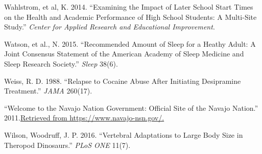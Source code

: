 \documentclass[
]{report}
\newlength{\cslhangindent}
\newenvironment{CSLReferences}[2] %
 {\begin{list}{}{%
  \setlength{\itemindent}{0pt}
  \setlength{\leftmargin}{0pt}
  \setlength{\parsep}{0pt}
  \ifodd #1
   \setlength{\leftmargin}{\cslhangindent}
   \setlength{\itemindent}{-1\cslhangindent}
  \fi
  \setlength{\itemsep}{#2\baselineskip}}}
 {\end{list}}
\begin{document}
\begin{CSLReferences}{1}{0}
Wahlstrom, et al, K. 2014. {``Examining the Impact of Later School Start Times on the Health and Academic Performance of High School Students: A Multi-Site Study.''} \emph{Center for Applied Research and Educational Improvement}.

Watson, et al., N. 2015. {``Recommended Amount of Sleep for a Heathy Adult: A Joint Consensus Statement of the American Academy of Sleep Medicine and Sleep Research Society.''} \emph{Sleep} 38(6).

Weiss, R. D. 1988. {``Relapse to Cocaine Abuse After Initiating Desipramine Treatment.''} \emph{JAMA} 260(17).

{``Welcome to the Navajo Nation Government: Official Site of the Navajo Nation.''} 2011.\href{\%20Retrieved\%20from\%20https://www.navajo-nsn.gov/.}{Retrieved from https://www.navajo-nsn.gov/.}

Wilson, Woodruff, J. P. 2016. {``Vertebral Adaptations to Large Body Size in Theropod Dinosaurs.''} \emph{PLoS ONE} 11(7).

\end{CSLReferences}
\end{document}
